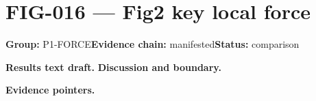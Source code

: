 \clearpage
\section{FIG-016 --- Fig2 key local force}
\label{figpage:fig-016}
\textbf{Group:} P1-FORCE\quad \textbf{Evidence chain:} manifested\quad \textbf{Status:} comparison

\textbf{Results text draft.} 
\textbf{Discussion and boundary.} 


\textbf{Evidence pointers.}



\vfill
